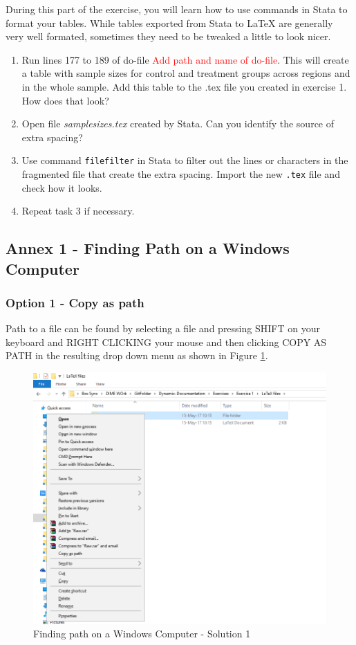 \documentclass[]{article}
\begin{document}
During this part of the exercise, you will learn how to use commands in Stata to format your tables. While tables exported from Stata to {\LaTeX} are generally very well formated, sometimes they need to be tweaked a little to look nicer.

\begin{enumerate}
	\item Run lines 177 to 189 of do-file \textcolor{red}{Add path and name of do-file}. This will create a table with sample sizes for control and treatment groups across regions and in the whole sample. Add this table to the .tex file you created in exercise 1. How does that look?
	\item Open file \emph{samplesizes.tex} created by Stata. Can you identify the source of extra spacing?
	\item Use command \texttt{filefilter} in Stata to filter out the lines or characters in the fragmented file that create the extra spacing. Import the new \texttt{.tex} file and check how it looks.
	\item Repeat task 3 if necessary.
\end{enumerate}

\newpage

\subsection*{Annex 1 - Finding Path on a Windows Computer}\label{annex:windows}

\subsubsection*{Option 1 - Copy as path}
Path to a file can be found by selecting a file and pressing {\color{red}SHIFT on your keyboard and RIGHT CLICKING your mouse and then clicking COPY AS PATH in the resulting drop down menu} as shown in Figure \ref{fig:pathwin3}.

\begin{figure}[h!]
	\centering
	\includegraphics[width=0.7\linewidth]{img/pathwin3}
	\caption{Finding path on a Windows Computer - Solution 1}
	\label{fig:pathwin3}
\end{figure}
\end{document}
